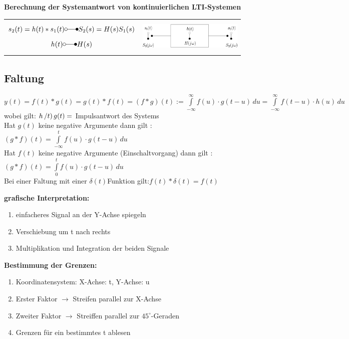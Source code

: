 		\textbf{Berechnung der Systemantwort von kontinuierlichen LTI-Systemen}\\
		\begin{tabular}{ll}
			\parbox{8cm}{
			$$s_2(t) = h(t) * s_1(t) \laplace S_2(s) = H(s) S_1(s)$$
			$$h(t) \laplace H(s)$$}
			& \parbox{4cm}{
			\includegraphics[width=5cm]{./bilder/utf-theorie.png}}\\
		\end{tabular}	
		
	\subsection{Faltung}
	$y(t) = f(t)\ast g(t) = g(t) \ast f(t) = (f \ast g)(t) :=
	\int\limits_{-\infty}^\infty f(u) \cdot g(t-u)\,du =
	\int\limits_{-\infty}^\infty f(t-u) \cdot h(u)\,du $ \\
	wobei gilt: $h\left/t\right) g(t) = $ Impulsantwort des Systems \\
	Hat $g\left(t\right)$ keine negative Argumente dann gilt :
	$\left(g \ast f \right)\left(t\right)=\int\limits_{-\infty}^t f(u) \cdot
	g(t-u)\,du$\\
	Hat $f\left(t\right)$ keine negative Argumente (Einschaltvorgang) dann gilt :
	$\left(g \ast f \right)\left(t\right)=\int\limits_{0}^t f(u) \cdot
	g(t-u)\,du$\\
	Bei einer Faltung mit einer $\delta\left(t\right)$Funktion
	gilt:$f\left(t\right) \ast \delta\left(t\right) = f\left(t\right)$\\
	
	\newpage
	
	\begin{multicols}{2}
		\textbf{grafische Interpretation:}
		\begin{enumerate}
  			\item einfacheres Signal an der Y-Achse spiegeln
  			\item Verschiebung um t nach rechts
  			\item Multiplikation und Integration der beiden Signale
		\end{enumerate}
		\columnbreak
		\textbf{Bestimmung der Grenzen:}
		\begin{enumerate}
		  \item Koordinatensystem: X-Achse: t, Y-Achse: u
		  \item Erster Faktor $\rightarrow$ Streifen parallel zur X-Achse
		  \item Zweiter Faktor $\rightarrow$ Streiffen parallel zur $45^{\circ}$-Geraden
		  \item Grenzen für ein bestimmtes t ablesen
		\end{enumerate}
	\end{multicols}	

